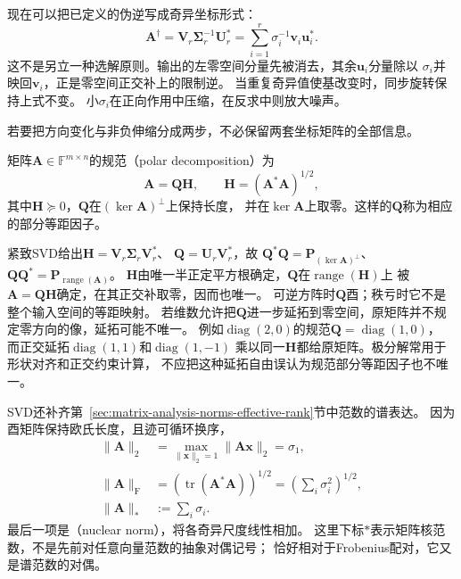 现在可以把已定义的伪逆写成奇异坐标形式：
\begin{equation}
 \bm A^\dagger
 =\bm V_r\bm\Sigma_r^{-1}\bm U_r^*
 =\sum_{i=1}^r\sigma_i^{-1}\bm v_i\bm u_i^*.
 \label{eq:matrix-analysis-pseudoinverse}
\end{equation}
这不是另立一种选解原则。输出的左零空间分量先被消去，其余$\bm u_i$分量除以
$\sigma_i$并映回$\bm v_i$，正是零空间正交补上的限制逆。
当重复奇异值使基改变时，同步旋转保持上式不变。
小$\sigma_i$在正向作用中压缩，在反求中则放大噪声。

若要把方向变化与非负伸缩分成两步，不必保留两套坐标矩阵的全部信息。
\begin{definition}[极分解与部分等距因子]
\label{def:matrix-analysis-polar-decomposition}
矩阵$\bm A\in\mathbb F^{m\times n}$的规范（polar decomposition）为
\begin{equation}
 \bm A=\bm Q\bm H,\qquad
 \bm H=(\bm A^*\bm A)^{1/2},
 \label{eq:matrix-analysis-polar-decomposition}
\end{equation}
其中$\bm H\succeq0$，$\bm Q$在$(\ker\bm A)^\perp$上保持长度，
并在$\ker\bm A$上取零。这样的$\bm Q$称为相应的部分等距因子。
\end{definition}
紧致SVD给出$\bm H=\bm V_r\bm\Sigma_r\bm V_r^*$、
$\bm Q=\bm U_r\bm V_r^*$，故
$\bm Q^*\bm Q=\bm P_{(\ker\bm A)^\perp}$、
$\bm Q\bm Q^*=\bm P_{\operatorname{range}(\bm A)}$。
$\bm H$由唯一半正定平方根确定，$\bm Q$在$\operatorname{range}(\bm H)$上
被$\bm A=\bm Q\bm H$确定，在其正交补取零，因而也唯一。
可逆方阵时$\bm Q$酉；秩亏时它不是整个输入空间的等距映射。
若维数允许把$\bm Q$进一步延拓到零空间，原矩阵并不规定零方向的像，延拓可能不唯一。
例如$\operatorname{diag}(2,0)$的规范$\bm Q=\operatorname{diag}(1,0)$，
而正交延拓$\operatorname{diag}(1,1)$和$\operatorname{diag}(1,-1)$
乘以同一$\bm H$都给原矩阵。极分解常用于形状对齐和正交约束计算，
不应把这种延拓自由误认为规范部分等距因子也不唯一。

SVD还补齐第~\ref{sec:matrix-analysis-norms-effective-rank}节中范数的谱表达。
因为酉矩阵保持欧氏长度，且迹可循环换序，
\begin{align}
 \lVert\bm A\rVert_2
 &=\max_{\lVert\bm x\rVert_2=1}\lVert\bm A\bm x\rVert_2=\sigma_1,
 \label{eq:matrix-analysis-spectral-norm}\\
 \lVert\bm A\rVert_{\mathrm F}
 &=\left(\operatorname{tr}(\bm A^*\bm A)\right)^{1/2}
   =\left(\sum_i\sigma_i^2\right)^{1/2},
 \label{eq:matrix-analysis-frobenius-norm}\\
 \lVert\bm A\rVert_*
 &:=\sum_i\sigma_i.
 \label{eq:matrix-analysis-nuclear-norm}
\end{align}
最后一项是（nuclear norm），将各奇异尺度线性相加。
这里下标$*$表示矩阵核范数，不是先前对任意向量范数的抽象对偶记号；
恰好相对于Frobenius配对，它又是谱范数的对偶。

